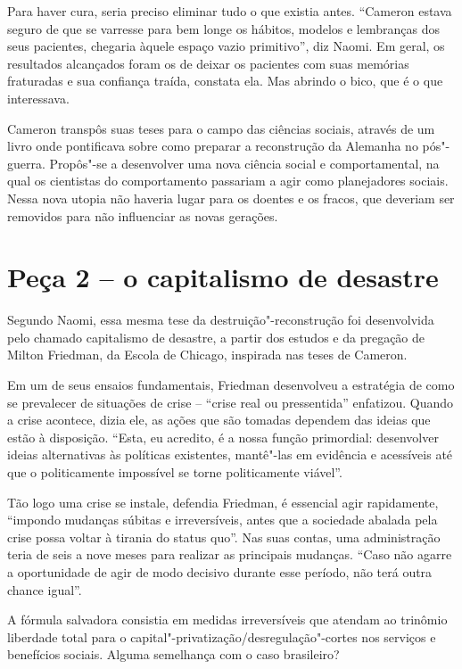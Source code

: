 Para haver cura, seria preciso eliminar tudo o que existia antes.
``Cameron estava seguro de que se varresse para bem longe os hábitos,
modelos e lembranças dos seus pacientes, chegaria àquele espaço vazio
primitivo'', diz Naomi. Em geral, os resultados alcançados foram os de
deixar os pacientes com suas memórias fraturadas e sua confiança traída,
constata ela. Mas abrindo o bico, que é o que interessava.

Cameron transpôs suas teses para o campo das ciências sociais, através
de um livro onde pontificava sobre como preparar a reconstrução da
Alemanha no pós"-guerra. Propôs"-se a desenvolver uma nova ciência social
e comportamental, na qual os cientistas do comportamento passariam a
agir como planejadores sociais. Nessa nova utopia não haveria lugar para
os doentes e os fracos, que deveriam ser removidos para não influenciar
as novas gerações.

\section{Peça 2 -- o capitalismo de desastre}

Segundo Naomi, essa mesma tese da destruição"-reconstrução foi
desenvolvida pelo chamado capitalismo de desastre, a partir dos estudos
e da pregação de Milton Friedman, da Escola de Chicago, inspirada nas
teses de Cameron.

Em um de seus ensaios fundamentais, Friedman desenvolveu a estratégia de
como se prevalecer de situações de crise -- ``crise real ou
pressentida'' enfatizou. Quando a crise acontece, dizia ele, as ações
que são tomadas dependem das ideias que estão à disposição. ``Esta, eu
acredito, é a nossa função primordial: desenvolver ideias alternativas
às políticas existentes, mantê"-las em evidência e acessíveis até que o
politicamente impossível se torne politicamente viável''.~

Tão logo uma crise se instale, defendia Friedman, é essencial agir
rapidamente, ``impondo mudanças súbitas e irreversíveis, antes que a
sociedade abalada pela crise possa voltar à tirania do status quo''. Nas
suas contas, uma administração teria de seis a nove meses para realizar
as principais mudanças. ``Caso não agarre a oportunidade de agir de modo
decisivo durante esse período, não terá outra chance igual''.

A fórmula salvadora consistia em medidas irreversíveis que atendam ao
trinômio liberdade total para o capital"-privatização/\allowbreak{}desregulação"-cortes
nos serviços e benefícios sociais. Alguma semelhança com o caso
brasileiro?

